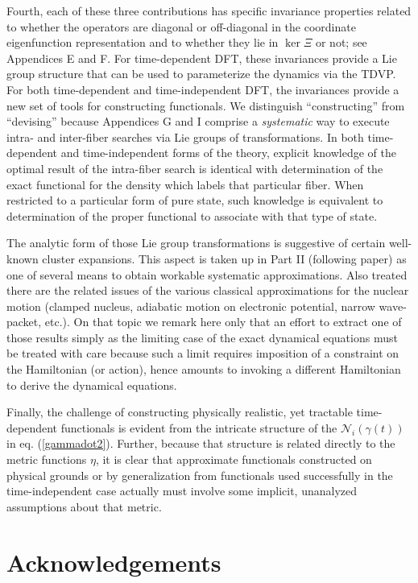 \documentclass[aps,preprint]{revtex4}%
\begin{document}
Fourth, each of these three contributions has specific invariance properties
related to whether the operators are diagonal or off-diagonal in the
coordinate eigenfunction representation and to whether they lie in $\ker\Xi$
or not; see Appendices E and F. For time-dependent DFT, these invariances
provide a Lie group structure that can be used to parameterize the dynamics
via the TDVP. For both time-dependent and time-independent DFT, the
invariances provide a new set of tools for constructing functionals. We
distinguish ``constructing'' from ``devising'' because Appendices G and I
comprise a \emph{systematic} way to execute intra- and inter-fiber searches
via Lie groups of transformations. In both time-dependent and time-independent
forms of the theory, explicit knowledge of the optimal result of the
intra-fiber search is identical with determination of the exact functional for
the density which labels that particular fiber. When restricted to a
particular form of pure state, such knowledge is equivalent to determination
of the proper functional to associate with that type of state.

The analytic form of those Lie group transformations is suggestive of certain
well-known cluster expansions.\cite{Blaizot86} This aspect is taken up in Part
II (following paper) as one of several means to obtain workable systematic
approximations. Also treated there are the related issues of the various
classical approximations for the nuclear motion (clamped nucleus, adiabatic
motion on electronic potential, narrow wave-packet, etc.). On that topic we
remark here only that an effort to extract one of those results simply as the
limiting case of the exact dynamical equations must be treated with care
because such a limit requires imposition of a constraint on the Hamiltonian
(or action), hence amounts to invoking a different Hamiltonian to derive the
dynamical equations.

Finally, the challenge of constructing physically realistic, yet tractable
time-dependent functionals is evident from the intricate structure of the
$\mathcal{N}_{i} (\gamma(t))$ in eq. (\ref{gammadot2}). Further, because that
structure is related directly to the metric functions $\eta$, it is clear that
approximate functionals constructed on physical grounds or by generalization
from functionals used successfully in the time-independent case actually must
involve some implicit, unanalyzed assumptions about that metric.

\section{Acknowledgements}
\end{document}
